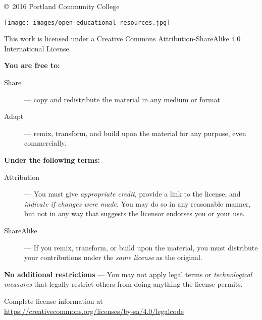 
\copyright\ 2016 \quad Portland Community College
\begin{center}
\texttt{[image: images/open-educational-resources.jpg]}
\end{center}
This work is licensed under a Creative Commons Attribution-ShareAlike 4.0 International License. 

\noindent\textbf{You are free to:}
\begin{description}
 \item[Share] --- copy and redistribute the material in any medium or format
 \item[Adapt] --- remix, transform, and build upon the material
for any purpose, even commercially.
\end{description}
\noindent\textbf{Under the following terms:}
\begin{description}
 \item[Attribution] --- You must give \emph{appropriate credit}, provide a link to the license, and \emph{indicate if changes were made}. You may do so in any reasonable manner, but not in any way that suggests the licensor endorses you or your use.
 \item[ShareAlike] --- If you remix, transform, or build upon the material, you must distribute your contributions under the \emph{same license} as the original.
\end{description}

\textbf{No additional restrictions} --- You may not apply legal terms or \emph{technological measures} that legally restrict others from doing anything the license permits.

\noindent Complete license information at\\
\url{https://creativecommons.org/licenses/by-sa/4.0/legalcode}

